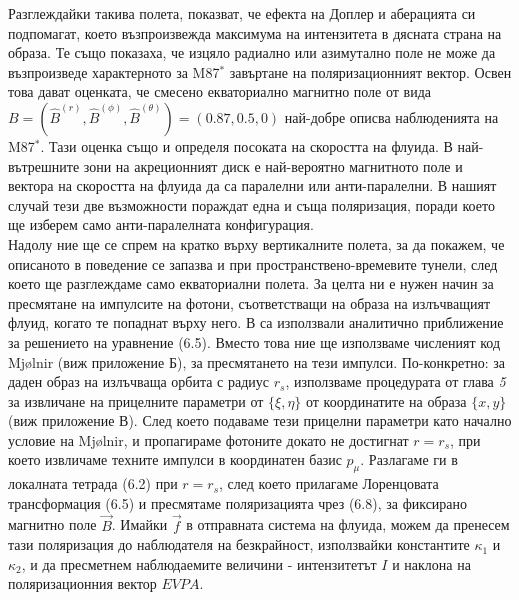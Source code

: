 Разглеждайки такива полета, \cite{Narayan2021} показват, че ефекта на Доплер и аберацията си подпомагат, което възпроизвежда максимума на интензитета в дясната страна на образа. Те също показаха, че изцяло радиално или азимутално поле не може да възпроизведе характерното за M87$^*$ завъртане на поляризационният вектор. Освен това дават оценката, че смесено екваториално магнитно поле от вида $B = (\hat{B}^{(r)},\hat{B}^{(\phi)},\hat{B}^{(\theta)}) = (0.87,0.5,0)$ най-добре описва наблюденията на M87$^*$. Тази оценка също и определя посоката на скоростта на флуида. В най-вътрешните зони на акреционният диск е най-вероятно магнитното поле и вектора на скоростта на флуида да са паралелни или анти-паралелни. В нашият случай тези две възможности пораждат една и съща поляризация, поради което ще изберем само анти-паралелната конфигурация.\\

Надолу ние ще се спрем на кратко върху вертикалните полета, за да покажем, че описаното в \cite{Narayan2021} поведение се запазва и при пространствено-времевите тунели, след което ще разглеждаме само екваториални полета. За целта ни е нужен начин за пресмятане на импулсите на фотони, съответстващи на образа на излъчващият флуид, когато те попаднат върху него. В \cite{Narayan2021} са използвали аналитично приближение за решението на уравнение (6.5). Вместо това ние ще използваме численият код Mjølnir (виж приложение Б), за пресмятането на тези импулси. По-конкретно: за даден образ на излъчваща орбита с радиус $r_s$, използваме процедурата от глава \emph{5} за извличане на прицелните параметри от $\{\xi,\eta\}$ от координатите на образа $\{x, y\}$ (виж приложение В). След което подаваме тези прицелни параметри като начално условие на Mjølnir, и пропагираме фотоните докато не достигнат $r = r_s$, при което извличаме техните импулси в координатен базис $p_\mu$. Разлагаме ги в локалната тетрада (6.2) при $r = r_s$, след което прилагаме Лоренцовата трансформация (6.5) и пресмятаме поляризацията чрез (6.8), за фиксирано магнитно поле $\vec{B}$. Имайки $\vec{f}$ в отправната система на флуида, можем да пренесем тази поляризация до наблюдателя на безкрайност, използвайки константите $\kappa_1$ и $\kappa_2$, и да пресметнем наблюдаемите величини - интензитетът $I$ и наклона на поляризационния вектор $EVPA$.
